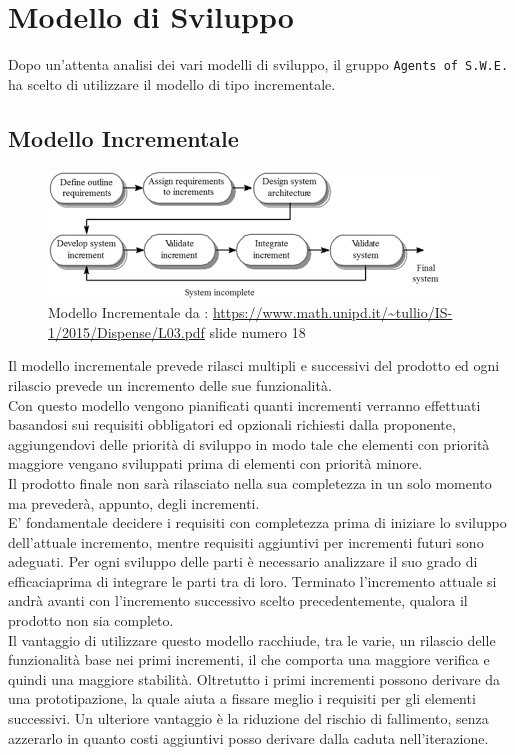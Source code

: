\section{Modello di Sviluppo}
\label{ModelloSviluppo}

Dopo un'attenta analisi dei vari modelli di sviluppo, il gruppo \texttt{Agents of S.W.E.} ha scelto di utilizzare il modello di tipo incrementale.

\subsection{Modello Incrementale}

\begin{figure}[h]
	\centering
  		\includegraphics[width=0.7\linewidth]{./images/modelloincrementale.png}
  		\caption{Modello Incrementale da : \url{https://www.math.unipd.it/~tullio/IS-1/2015/Dispense/L03.pdf} slide numero 18}
  		\label{fig:Modello Incrementale}
\end{figure}

Il modello incrementale prevede rilasci multipli e successivi del prodotto ed ogni rilascio prevede un incremento delle sue funzionalità. \\
Con questo modello vengono pianificati quanti incrementi verranno effettuati basandosi sui requisiti obbligatori ed opzionali richiesti dalla proponente, aggiungendovi delle priorità di sviluppo in modo tale che elementi con priorità maggiore vengano sviluppati prima di elementi con priorità minore.\\
Il prodotto finale non sarà rilasciato nella sua completezza in un solo momento ma prevederà, appunto, degli incrementi. \\
E' fondamentale decidere i requisiti con completezza prima di iniziare lo sviluppo dell'attuale incremento, mentre requisiti aggiuntivi per incrementi futuri sono adeguati. Per ogni sviluppo delle parti è necessario analizzare il suo grado di efficacia\glossario prima di integrare le parti tra di loro. Terminato l'incremento attuale si andrà avanti con l'incremento successivo scelto precedentemente, qualora il prodotto non sia completo. \\
Il vantaggio di utilizzare questo modello racchiude, tra le varie, un rilascio delle funzionalità base nei primi incrementi, il che comporta una maggiore verifica e quindi una maggiore stabilità. Oltretutto i primi incrementi possono derivare da una prototipazione, la quale aiuta a fissare meglio i requisiti per gli elementi successivi. Un ulteriore vantaggio è la riduzione del rischio di fallimento, senza azzerarlo in quanto costi aggiuntivi posso derivare dalla caduta nell'iterazione\glossario.

